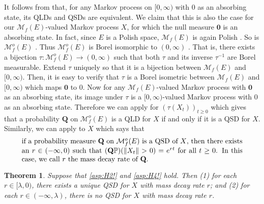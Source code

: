 \documentclass[12pt,a4paper]{amsart}
\numberwithin{equation}{section}
\theoremstyle{plain}
\newtheorem{thm}{Theorem}[section]
\theoremstyle{definition}
\theoremstyle{remark}
\begin{document}
	It follows from \cite[Proposition 1]{MeleardVillemonais2012Quasi-stationary} that, for any Markov process on $[0,\infty)$ with $0$ as an absorbing state, its QLDs and QSDs are equivalent.
	We claim that this is also the case for our $\mathcal M_f(E)$-valued Markov process
	$X$,
	for which the null measure $\mathbf 0$ is an absorbing state.
	In fact, since $E$ is a Polish space, $\mathcal M_f(E)$ is again Polish \cite[Lemma 4.3]{Kallenberg2017Random}.
	So is $\mathcal M^o_f(E)$ \cite[Theorem A1.2]{Kallenberg2002Foundations}.
	Thus $\mathcal M^o_f(E)$ is Borel isomorphic to $(0,\infty)$ \cite[Theorem A.1.6]{Kallenberg2002Foundations}.
	That is, there exists a bijection $\tau: \mathcal M^o_f(E) \to (0,\infty)$ such that both $\tau$ and its inverse $\tau^{-1}$ are Borel measurable.
	Extend $\tau$ uniquely so that it is a bijection between $\mathcal M_f(E)$ and $[0,\infty)$.
	Then, it is easy to verify that $\tau$ is a Borel isometric between $\mathcal M_f(E)$ and $[0,\infty)$ which maps $\mathbf 0$ to $0$. 
	Now for any $\mathcal M_f(E)$-valued Markov process with $\mathbf 0$ as an absorbing state,
	its image under $\tau$ is a $[0,\infty)$-valued Markov process with $0$ as an absorbing state.
	Therefore we can apply \cite[Proposition 1]{MeleardVillemonais2012Quasi-stationary} for $(\tau(X_t))_{t\geq 0}$ which gives that
	a probability $\mathbf Q$ on $\mathcal M^o_f(E)$ is a QLD for $X$ if and only if it is a QSD for $X$.
	Similarly, we can apply \cite[Proposition 2]{MeleardVillemonais2012Quasi-stationary} to $X$ which says that
\begin{equation} \label{eq:S.2}
\begin{minipage}{0.9\textwidth}
	if a probability measure $\mathbf Q$ on $\mathcal M^o_f(E)$ is a QSD of $X$, then there exists an $r\in (-\infty,0)$ such that $(\mathbf Q\mathbb P)(\|X_t\|>0) = e^{rt}$ for all $t\geq 0$.
	In this case, we call $r$ the mass decay rate of $\mathbf Q$.
\end{minipage}
\end{equation}
	
\begin{thm} \label{thm:QSD}
	Suppose that \eqref{asp:H2!} and \eqref{asp:H4!} hold.
	Then (1) for each $r \in [\lambda, 0)$, there exists a unique QSD for $X$ with mass decay rate $r$;
	and (2) for each $r\in (-\infty, \lambda)$, there is no QSD for $X$ with mass decay rate $r$.
\end{thm}
\end{document}
